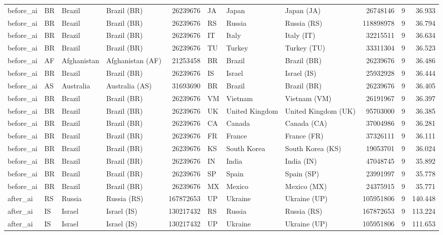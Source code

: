 \begin{tabular}{llllrlllrrr}
before\_ai & BR & Brazil & Brazil (BR) & 26239676 & JA & Japan & Japan (JA) & 26748146 & 9 & 36.933 \\
before\_ai & BR & Brazil & Brazil (BR) & 26239676 & RS & Russia & Russia (RS) & 118898978 & 9 & 36.794 \\
before\_ai & BR & Brazil & Brazil (BR) & 26239676 & IT & Italy & Italy (IT) & 32215511 & 9 & 36.634 \\
before\_ai & BR & Brazil & Brazil (BR) & 26239676 & TU & Turkey & Turkey (TU) & 33311304 & 9 & 36.523 \\
before\_ai & AF & Afghanistan & Afghanistan (AF) & 21253458 & BR & Brazil & Brazil (BR) & 26239676 & 9 & 36.486 \\
before\_ai & BR & Brazil & Brazil (BR) & 26239676 & IS & Israel & Israel (IS) & 25932928 & 9 & 36.444 \\
before\_ai & AS & Australia & Australia (AS) & 31693690 & BR & Brazil & Brazil (BR) & 26239676 & 9 & 36.405 \\
before\_ai & BR & Brazil & Brazil (BR) & 26239676 & VM & Vietnam & Vietnam (VM) & 26191967 & 9 & 36.397 \\
before\_ai & BR & Brazil & Brazil (BR) & 26239676 & UK & United Kingdom & United Kingdom (UK) & 95703000 & 9 & 36.385 \\
before\_ai & BR & Brazil & Brazil (BR) & 26239676 & CA & Canada & Canada (CA) & 37004986 & 9 & 36.281 \\
before\_ai & BR & Brazil & Brazil (BR) & 26239676 & FR & France & France (FR) & 37326111 & 9 & 36.111 \\
before\_ai & BR & Brazil & Brazil (BR) & 26239676 & KS & South Korea & South Korea (KS) & 19053701 & 9 & 36.024 \\
before\_ai & BR & Brazil & Brazil (BR) & 26239676 & IN & India & India (IN) & 47048745 & 9 & 35.892 \\
before\_ai & BR & Brazil & Brazil (BR) & 26239676 & SP & Spain & Spain (SP) & 23991997 & 9 & 35.778 \\
before\_ai & BR & Brazil & Brazil (BR) & 26239676 & MX & Mexico & Mexico (MX) & 24375915 & 9 & 35.771 \\
after\_ai & RS & Russia & Russia (RS) & 167872653 & UP & Ukraine & Ukraine (UP) & 105951806 & 9 & 140.448 \\
after\_ai & IS & Israel & Israel (IS) & 130217432 & RS & Russia & Russia (RS) & 167872653 & 9 & 113.224 \\
after\_ai & IS & Israel & Israel (IS) & 130217432 & UP & Ukraine & Ukraine (UP) & 105951806 & 9 & 111.653 \\

\end{tabular}
